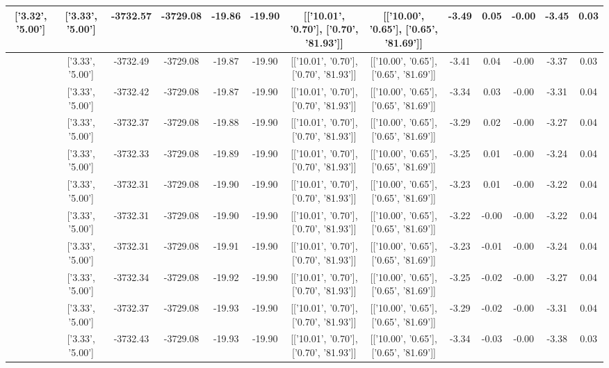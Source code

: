 \begin{table}[htbp]
\begin{adjustbox}{angle=90}
\begin{tabular}{|c|c|c|c|c|c|c|c|c|c|c|c|c|}
 ['3.32', '5.00'] & ['3.33', '5.00'] & -3732.57 & -3729.08 & -19.86 & -19.90 & [['10.01', '0.70'], ['0.70', '81.93']] & [['10.00', '0.65'], ['0.65', '81.69']] & -3.49 & 0.05 & -0.00 & -3.45 & 0.03\\ \hline
 ['3.32', '5.00'] & ['3.33', '5.00'] & -3732.49 & -3729.08 & -19.87 & -19.90 & [['10.01', '0.70'], ['0.70', '81.93']] & [['10.00', '0.65'], ['0.65', '81.69']] & -3.41 & 0.04 & -0.00 & -3.37 & 0.03\\ \hline
 ['3.33', '5.00'] & ['3.33', '5.00'] & -3732.42 & -3729.08 & -19.87 & -19.90 & [['10.01', '0.70'], ['0.70', '81.93']] & [['10.00', '0.65'], ['0.65', '81.69']] & -3.34 & 0.03 & -0.00 & -3.31 & 0.04\\ \hline
 ['3.33', '5.00'] & ['3.33', '5.00'] & -3732.37 & -3729.08 & -19.88 & -19.90 & [['10.01', '0.70'], ['0.70', '81.93']] & [['10.00', '0.65'], ['0.65', '81.69']] & -3.29 & 0.02 & -0.00 & -3.27 & 0.04\\ \hline
 ['3.33', '5.00'] & ['3.33', '5.00'] & -3732.33 & -3729.08 & -19.89 & -19.90 & [['10.01', '0.70'], ['0.70', '81.93']] & [['10.00', '0.65'], ['0.65', '81.69']] & -3.25 & 0.01 & -0.00 & -3.24 & 0.04\\ \hline
 ['3.33', '5.00'] & ['3.33', '5.00'] & -3732.31 & -3729.08 & -19.90 & -19.90 & [['10.01', '0.70'], ['0.70', '81.93']] & [['10.00', '0.65'], ['0.65', '81.69']] & -3.23 & 0.01 & -0.00 & -3.22 & 0.04\\ \hline
 ['3.33', '5.00'] & ['3.33', '5.00'] & -3732.31 & -3729.08 & -19.90 & -19.90 & [['10.01', '0.70'], ['0.70', '81.93']] & [['10.00', '0.65'], ['0.65', '81.69']] & -3.22 & -0.00 & -0.00 & -3.22 & 0.04\\ \hline
 ['3.33', '5.00'] & ['3.33', '5.00'] & -3732.31 & -3729.08 & -19.91 & -19.90 & [['10.01', '0.70'], ['0.70', '81.93']] & [['10.00', '0.65'], ['0.65', '81.69']] & -3.23 & -0.01 & -0.00 & -3.24 & 0.04\\ \hline
 ['3.33', '5.01'] & ['3.33', '5.00'] & -3732.34 & -3729.08 & -19.92 & -19.90 & [['10.01', '0.70'], ['0.70', '81.93']] & [['10.00', '0.65'], ['0.65', '81.69']] & -3.25 & -0.02 & -0.00 & -3.27 & 0.04\\ \hline
 ['3.33', '5.01'] & ['3.33', '5.00'] & -3732.37 & -3729.08 & -19.93 & -19.90 & [['10.01', '0.70'], ['0.70', '81.93']] & [['10.00', '0.65'], ['0.65', '81.69']] & -3.29 & -0.02 & -0.00 & -3.31 & 0.04\\ \hline
 ['3.34', '5.01'] & ['3.33', '5.00'] & -3732.43 & -3729.08 & -19.93 & -19.90 & [['10.01', '0.70'], ['0.70', '81.93']] & [['10.00', '0.65'], ['0.65', '81.69']] & -3.34 & -0.03 & -0.00 & -3.38 & 0.03\\ \hline

\end{tabular}
\end{adjustbox}
\end{table}
